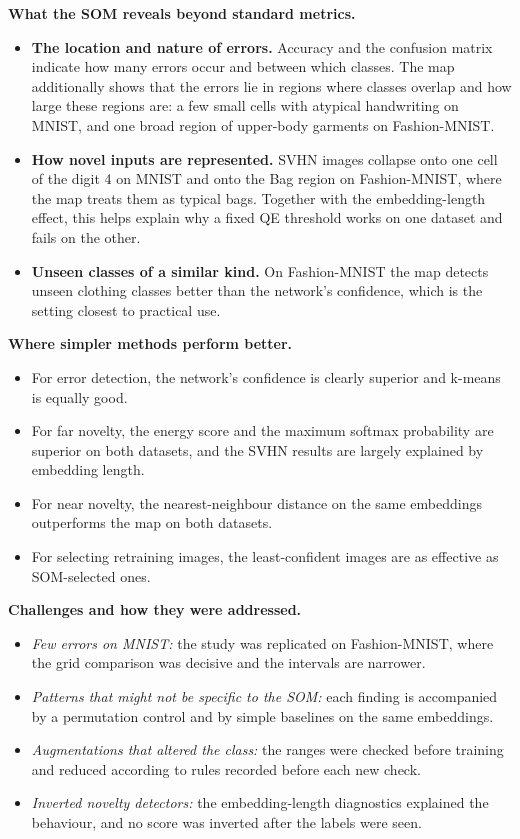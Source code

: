 \documentclass{scrartcl}
\begin{document}
\textbf{What the SOM reveals beyond standard metrics.}
\begin{itemize}
  \item \textbf{The location and nature of errors.} Accuracy and the confusion matrix indicate how many errors occur and between which classes. The map additionally shows that the errors lie in regions where classes overlap and how large these regions are: a few small cells with atypical handwriting on MNIST, and one broad region of upper-body garments on Fashion-MNIST.
  \item \textbf{How novel inputs are represented.} SVHN images collapse onto one cell of the digit 4 on MNIST and onto the Bag region on Fashion-MNIST, where the map treats them as typical bags. Together with the embedding-length effect, this helps explain why a fixed QE threshold works on one dataset and fails on the other.
  \item \textbf{Unseen classes of a similar kind.} On Fashion-MNIST the map detects unseen clothing classes better than the network's confidence, which is the setting closest to practical use.
\end{itemize}

\textbf{Where simpler methods perform better.}
\begin{itemize}
  \item For error detection, the network's confidence is clearly superior and k-means is equally good.
  \item For far novelty, the energy score and the maximum softmax probability are superior on both datasets, and the SVHN results are largely explained by embedding length.
  \item For near novelty, the nearest-neighbour distance on the same embeddings outperforms the map on both datasets.
  \item For selecting retraining images, the least-confident images are as effective as SOM-selected ones.
\end{itemize}

\textbf{Challenges and how they were addressed.}
\begin{itemize}
  \item \emph{Few errors on MNIST:} the study was replicated on Fashion-MNIST, where the grid comparison was decisive and the intervals are narrower.
  \item \emph{Patterns that might not be specific to the SOM:} each finding is accompanied by a permutation control and by simple baselines on the same embeddings.
  \item \emph{Augmentations that altered the class:} the ranges were checked before training and reduced according to rules recorded before each new check.
  \item \emph{Inverted novelty detectors:} the embedding-length diagnostics explained the behaviour, and no score was inverted after the labels were seen.
\end{itemize}
\end{document}

